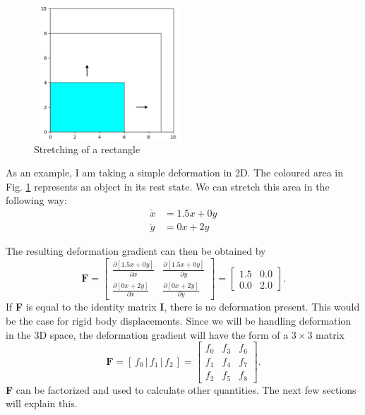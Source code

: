 \begin{figure}
\centering
	\includegraphics[width=5.5cm]{resources/stretch_plot.png}
	\caption[Stretching of a rectangle]{Stretching of a rectangle}
	\label{stretch:1}
\end{figure}
As an example, I am taking a simple deformation in 2D. The coloured area in Fig. \ref{stretch:1} represents an object in its rest state. We can stretch this area in the following way:
\begin{align*}
	\check{x} &= 1.5x + 0y		\\
	\check{y} &= 0x + 2y	
\end{align*}

The resulting deformation gradient can then be obtained by
\[
	\mathbf{F} = \begin{bmatrix} \frac{\partial [1.5x + 0y]}{\partial x} & \frac{\partial [1.5x + 0y]}{\partial y} \\ \frac{\partial [0x + 2y]}{\partial x} & \frac{\partial [0x + 2y]}{\partial y} \end{bmatrix} = \begin{bmatrix} 1.5 & 0.0 \\ 0.0 & 2.0 \end{bmatrix}.
\]
If \textbf{F} is equal to the identity matrix \textbf{I}, there is no deformation present. This would be the case for rigid body displacements. Since we will be handling deformation in the 3D space, the deformation gradient will have the form of a $3 \times 3$ matrix 
\begin{equation}\label{eq:deformation_gradient}
\textbf{F} = \left[ \,f_0\, \bigg| \,f_1\, \bigg| \,f_2\, \right] = \begin{bmatrix} f_0 & f_3 & f_6 \\ f_1 & f_4 & f_7 \\ f_2 & f_5 & f_8 \end{bmatrix}.
\end{equation}
\textbf{F} can be factorized and used to calculate other quantities. The next few sections will explain this.

